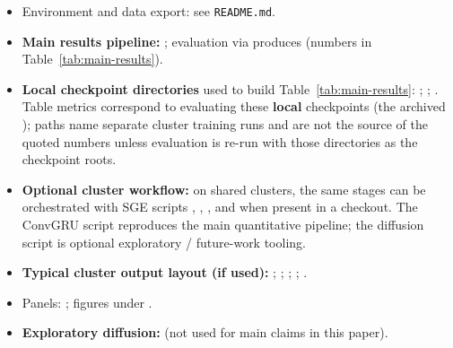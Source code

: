 \documentclass[11pt]{article}
\begin{document}
\sloppy
\begin{itemize}[leftmargin=1.3em,itemsep=3pt]
  \item Environment and data export: see \texttt{README.md}.
  \item \textbf{Main results pipeline:} ; evaluation via
         produces  (numbers in
        Table~\ref{tab:main-results}).
  \item \textbf{Local checkpoint directories} used to build Table~\ref{tab:main-results}:
        ;
        ;
        .
        Table metrics correspond to evaluating these \textbf{local} checkpoints (the archived
        );  paths name
        separate cluster training runs and are not the source of the quoted numbers unless evaluation is
        re-run with those directories as the checkpoint roots.
  \item \textbf{Optional cluster workflow:} on shared clusters, the same stages can be orchestrated with SGE
        scripts
        ,
        ,
        , and
        when present in a checkout. The ConvGRU script reproduces the main quantitative
        pipeline; the diffusion script is optional exploratory / future-work tooling.
  \item \textbf{Typical cluster output layout (if used):}
        ;
        ;
        ;
        ;
        .
  \item Panels: ; figures under .
  \item \textbf{Exploratory diffusion:}  (not used for main claims in
        this paper).
\end{itemize}
\fussy
\end{document}
